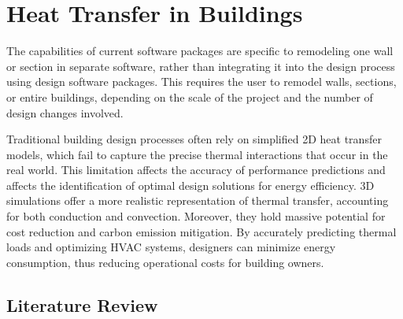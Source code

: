\chapter{Heat Transfer in Buildings}



The capabilities of current software packages are specific to remodeling one wall or section in separate software, rather than integrating it into the design process using design software packages.  
This requires the user to remodel walls, sections, or entire buildings, depending on the scale of the project and the number of design changes involved.

Traditional building design processes often rely on simplified 2D heat transfer models, which fail to capture the precise thermal interactions that occur in the real world. This limitation affects the accuracy of performance predictions and affects the identification of optimal design solutions for energy efficiency. 
3D simulations offer a more realistic representation of thermal transfer, accounting for both conduction and convection. 
Moreover, they hold massive potential for cost reduction and carbon emission mitigation. 
By accurately predicting thermal loads and optimizing HVAC systems, designers can minimize energy consumption, thus reducing operational costs for building owners. 







\section{Literature Review}






